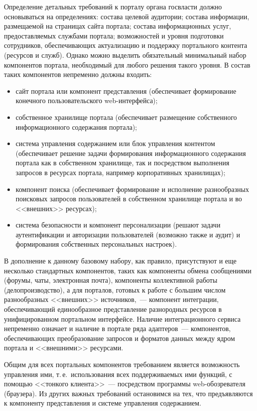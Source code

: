 \begin{multicols}{2}
Определение детальных требований к порталу органа госвласти должно основываться на
определениях: состава целевой аудитории; состава информации, размещаемой на
страницах сайта портала; состава информационных услуг, предоставляемых службами
портала; возможностей и уровня подготовки сотрудников, обеспечивающих актуализацию
и поддержку портального контента (ресурсов и служб). Однако можно выделить
обязательный минимальный набор компонентов портала, необходимый для любого
решения такого уровня. В состав таких компонентов непременно должны входить:
\begin{itemize}
\item сайт портала или компонент представления (обеспечивает формирование
конечного пользовательского web-интерфейса);
\item собственное хранилище портала (обеспечивает размещение собственного
информационного содержания портала);
\item система управления содержанием или блок управления контентом (обеспечивает
решение задачи формирования информационного содержания портала как в
собственном хранилище, так и посредством выполнения запросов в ресурсах портала,
например корпоративных хранилищах);
\item компонент поиска (обеспечивает формирование и исполнение разнообразных
поисковых запросов пользователей в собственном хранилище портала и во
<<внешних>> ресурсах);
\item система безопасности и компонент персонализации (решают задачи
аутентификации и авторизации пользователей (возможно также и \mbox{аудит}) и
формирования собственных персональных настроек).
\end{itemize}

В дополнение к данному базовому набору, как правило, присутствуют и еще несколько
стандартных компонентов, таких как компоненты обмена сообщениями (форумы, чаты,
электронная почта), компоненты коллективной работы (делопроизводство), а для
порталов, готовых к работе с большим числом разнообразных <<внешних>>
источников,~--- компонент интеграции, обеспечивающий единообразное представление
разнородных ресурсов в унифицированном портальном интерфейсе. Наличие
интеграционного сервиса непременно означает и наличие в портале ряда адаптеров~---
компонентов, обеспечивающих преобразование запросов и форматов данных между
ядром портала и <<внешними>> ресурсами.

Общим для всех портальных компонентов требованием является возможность управления
ими, т.\,е.\ использования всех поддерживаемых ими функций, с помощью <<тонкого
клиента>>~--- посредством программы web-обозревателя (браузера). Из других важных
требований остановимся на тех, что предъявляются к компоненту представления и
сис\-те\-ме управления содержанием.


\end{multicols}
